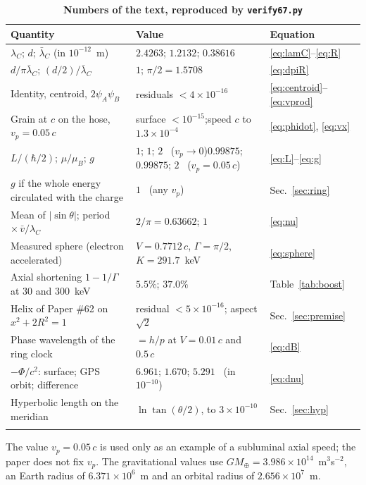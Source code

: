 \documentclass[%
 reprint, amsmath,amssymb, aps, prb, ]{revtex4-2}
\numberwithin{equation}{section}
\newcommand{\lamC}{\lambda_C}
\newcommand{\lbar}{\bar{\lambda}_C}
\begin{document}
\begin{table}[t!]
\centering
\caption{\textbf{Numbers of the text, reproduced by \texttt{verify67.py}}}
\label{tab:numbers}
\renewcommand{\arraystretch}{1.4}
\begin{tabular}{p{5.4cm}p{5.6cm}p{4.0cm}}
\toprule
\textbf{Quantity} & \textbf{Value} & \textbf{Equation} \\
\midrule
$\lamC$; $d$; $\lbar$ (in $10^{-12}$~m)
& $2.4263$; $1.2132$; $0.38616$
& \eqref{eq:lamC}--\eqref{eq:R} \\
\addlinespace[0.3cm]
$d/\pi\lbar$; $(d/2)/\lbar$
& $1$; $\pi/2 = 1.5708$
& \eqref{eq:dpiR} \\
\addlinespace[0.3cm]
Identity, centroid, $2\psi_A\psi_B$
& residuals $< 4\times10^{-16}$
& \eqref{eq:centroid}--\eqref{eq:vprod} \\
\addlinespace[0.3cm]
Grain at $c$ on the hose, $v_p = 0.05\,c$
& surface $< 10^{-15}$;\newline speed $c$ to $1.3\times10^{-4}$
& \eqref{eq:phidot}, \eqref{eq:vx} \\
\addlinespace[0.3cm]
$L/(\hbar/2)$; $\mu/\mu_B$; $g$
& $1$; $1$; $2$ \ ($v_p \to 0$)\newline $0.99875$; $0.99875$; $2$ \ ($v_p = 0.05\,c$)
& \eqref{eq:L}--\eqref{eq:g} \\
\addlinespace[0.3cm]
$g$ if the whole energy circulated with the charge
& $1$ \ (any $v_p$)
& Sec.~\ref{sec:ring} \\
\addlinespace[0.3cm]
Mean of $|\sin\theta|$; period $\times\,\bar v/\lamC$
& $2/\pi = 0.63662$; $1$
& \eqref{eq:nu} \\
\addlinespace[0.3cm]
Measured sphere (electron accelerated)
& $V = 0.7712\,c$, $\Gamma = \pi/2$, $K = 291.7$~keV
& \eqref{eq:sphere} \\
\addlinespace[0.3cm]
Axial shortening $1 - 1/\Gamma$ at $30$ and $300$~keV
& $5.5\%$; $37.0\%$
& Table~\ref{tab:boost} \\
\addlinespace[0.3cm]
Helix of Paper \#62 on $x^2 + 2R^2 = 1$
& residual $< 5\times10^{-16}$; aspect $\sqrt2$
& Sec.~\ref{sec:premise} \\
\addlinespace[0.3cm]
Phase wavelength of the ring clock
& $= h/p$ at $V = 0.01\,c$ and $0.5\,c$
& \eqref{eq:dB} \\
\addlinespace[0.3cm]
$-\Phi/c^2$: surface; GPS orbit; difference
& $6.961$; $1.670$; $5.291$ \ (in $10^{-10}$)
& \eqref{eq:dnu} \\
\addlinespace[0.3cm]
Hyperbolic length on the meridian
& $\ln\tan(\theta/2)$, to $3\times10^{-10}$
& Sec.~\ref{sec:hyp} \\
\addlinespace[0.2cm]
\bottomrule
\end{tabular}
\vspace{0.2cm}
\begin{minipage}{0.95\textwidth}
\justifying\footnotesize
The value $v_p = 0.05\,c$ is used only as an example of a subluminal axial speed; the paper does not fix $v_p$. The gravitational values use $GM_\oplus = 3.986\times10^{14}$~m$^3$s$^{-2}$, an Earth radius of $6.371\times10^{6}$~m and an orbital radius of $2.656\times10^{7}$~m.
\end{minipage}
\end{table}
\end{document}
